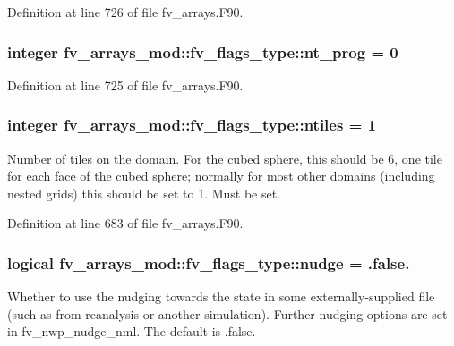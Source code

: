 Definition at line 726 of file fv\-\_\-arrays.\-F90.

\subsubsection[{nt\-\_\-prog}]{\setlength{\rightskip}{0pt plus 5cm}integer fv\-\_\-arrays\-\_\-mod\-::fv\-\_\-flags\-\_\-type\-::nt\-\_\-prog = 0}\label{structfv__arrays__mod_1_1fv__flags__type_a567ce430887199ba62b515cef02229cb}


Definition at line 725 of file fv\-\_\-arrays.\-F90.

\subsubsection[{ntiles}]{\setlength{\rightskip}{0pt plus 5cm}integer fv\-\_\-arrays\-\_\-mod\-::fv\-\_\-flags\-\_\-type\-::ntiles = 1}\label{structfv__arrays__mod_1_1fv__flags__type_a42bc0b8fb2b3f05963d42058ea9da803}


Number of tiles on the domain. For the cubed sphere, this should be 6, one tile for each face of the cubed sphere; normally for most other domains (including nested grids) this should be set to 1. Must be set. 



Definition at line 683 of file fv\-\_\-arrays.\-F90.

\subsubsection[{nudge}]{\setlength{\rightskip}{0pt plus 5cm}logical fv\-\_\-arrays\-\_\-mod\-::fv\-\_\-flags\-\_\-type\-::nudge = .false.}\label{structfv__arrays__mod_1_1fv__flags__type_a2071b6839462ecbe65b18ec014b7891c}


Whether to use the nudging towards the state in some externally-\/supplied file (such as from reanalysis or another simulation). Further nudging options are set in fv\-\_\-nwp\-\_\-nudge\-\_\-nml. The default is .false. 



